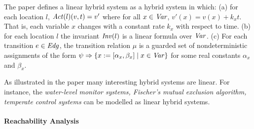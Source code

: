 The paper defines a linear hybrid system as a hybrid system in which:
(a) for each location $l$, $\mathit{Act}(l)(v,t) = v'$ where for all $x \in \mathit{Var}$, $v'(x) = v(x) + k_x t$. That is, each variable $x$ changes with a constant rate $k_x$ with respect to time.
(b) for each location $l$ the invariant $\mathit{Inv}(l)$ is a linear formula over $\mathit{Var}$.
(c) For each transition $e \in \mathit{Edg}$, the transition relation $\mu$ is a guarded set of nondeterministic assignments of the form $\psi \Rightarrow \{ x := [\alpha_x,\beta_x] \; | \; x \in \mathit{Var} \}$ for some real constants $\alpha_x$ and $\beta_x$.

As illustrated in the paper many interesting hybrid systems are linear. For instance, the \textit{water-level monitor systems, Fischer's mutual exclusion algorithm, temperate control systems} can be modelled as linear hybrid systems. 

\paragraph*{\textbf{Reachability Analysis}}



